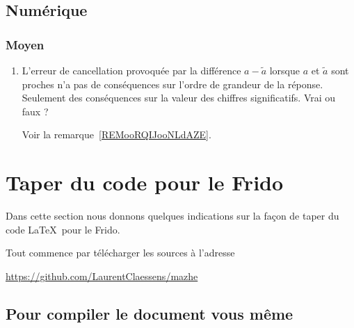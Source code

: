 \subsection{Numérique}

\subsubsection{Moyen}

\begin{enumerate}
    \item
        L'erreur de cancellation provoquée par la différence \( a-\tilde a\) lorsque \( a\) et \( \tilde a\) sont proches n'a pas de conséquences sur l'ordre de grandeur de la réponse. Seulement des conséquences sur la valeur des chiffres significatifs. Vrai ou faux ?

        Voir la remarque~\ref{REMooRQIJooNLdAZE}.
\end{enumerate}

\section{Taper du code pour le Frido}

Dans cette section nous donnons quelques indications sur la façon de taper du code \LaTeX\ pour le Frido.

Tout commence par télécharger les sources à l'adresse
\begin{center}
    \url{https://github.com/LaurentClaessens/mazhe}
\end{center}

\subsection{Pour compiler le document vous même}


